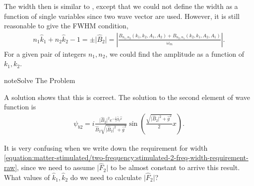 \documentclass[letterpaper,12pt,english]{sphinxmanual}
\begin{document}
The width then is similar to {\hyperref[\detokenize{matter-stimulated/single-frequency:single-frequency-equation-eqn-single-frequency-width-guessing}]{}}, except that we could not define the width as a function of single variables since two wave vector are used. However, it is still reasonable to give the FWHM condition,
\label{\detokenize{matter-stimulated/two-frequency:equation-stimulated-2-freq-width-requirement-raw}}\begin{equation}\label{equation:matter-stimulated/two-frequency:stimulated-2-freq-width-requirement-raw}
\begin{split}n_1 \hat k_1 + n_2 \hat k_2 - 1 = \pm \lvert \hat B_2 \rvert = \left\lvert \frac{B_{n_1,n_2}(k_1,k_2,A_1,A_2) + B_{n_2,n_1}(k_2,k_1,A_2,A_1)}{\omega_m} \right\rvert.\end{split}
\end{equation}
For a given pair of integers \(n_1,n_2\), we could find the amplitude as a function of \(k_1, k_2\).

\begin{sphinxadmonition}{note}{Solve The Problem}

A solution shows that this is correct. The solution to the second element of wave function is
\begin{equation*}
\begin{split}\psi_{b2} = i \frac{ \lvert \hat B_2\rvert^2 e^{-\frac{i}{2} \hat g_2 \hat x} }{ \hat B_2 \sqrt{\lvert \hat B_2\rvert^2 + \hat g^2} }\sin\left( \frac{\sqrt{ \lvert \hat B_2 \rvert^2 + \hat g^2 }}{2}x \right)  .\end{split}
\end{equation*}\end{sphinxadmonition}

It is very confusing when we write down the requirement for width \eqref{equation:matter-stimulated/two-frequency:stimulated-2-freq-width-requirement-raw}, since we need to assume \(\lvert \hat F_2 \rvert\) to be almost constant to arrive this result. What values of \(\hat k_1,\hat k_2\) do we need to calculate \(\lvert \hat F_2 \rvert\)?
\end{document}
